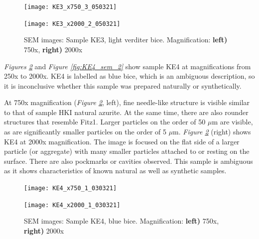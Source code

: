 \begin{figure}[H]
\centering
\begin{minipage}{.45\textwidth}
  \centering
  \texttt{[image: KE3\_x750\_3\_050321]}
\end{minipage}
\begin{minipage}{.45\textwidth}
  \centering
  \texttt{[image: KE3\_x2000\_2\_050321]}
\end{minipage}
\caption[SEM images: Sample KE3, light verditer bice]{SEM images: Sample KE3, light verditer bice. Magnification: \textbf{left)} 750x, \textbf{right)} 2000x}
\label{fig:KE3_sem_1}
\end{figure}


\textit{Figures \ref{fig:KE4_sem_1}} and \textit{Figure \ref{fig:KE4_sem_2}} show sample KE4 at magnifications from 250x to 2000x. KE4 is labelled as blue bice, which is an ambiguous description, so it is inconclusive whether this sample was prepared naturally or synthetically.

At 750x magnification (\textit{Figure \ref{fig:KE4_sem_1}}, left), fine needle-like structure is visible similar to that of sample HKI natural azurite. At the same time, there are also rounder structures that resemble Fitz1. Larger particles on the order of 50 $\mu$m are visible, as are significantly smaller particles on the order of 5 $\mu$m. \textit{Figure \ref{fig:KE4_sem_1}} (right) shows KE4 at 2000x magnification. The image is focused on the flat side of a larger particle (or aggregate) with many smaller particles attached to or resting on the surface. There are also pockmarks or cavities observed. This sample is ambiguous as it shows characteristics of known natural as well as synthetic samples.

\begin{figure}[H]
\centering
\begin{minipage}{.45\textwidth}
  \centering
  \texttt{[image: KE4\_x750\_1\_030321]}
\end{minipage}
\begin{minipage}{.45\textwidth}
  \centering
  \texttt{[image: KE4\_x2000\_1\_030321]}
\end{minipage}
\caption[SEM images: Sample KE4, blue bice]{SEM images: Sample KE4, blue bice. Magnification: \textbf{left)} 750x, \textbf{right)} 2000x}
\label{fig:KE4_sem_1}
\end{figure}


